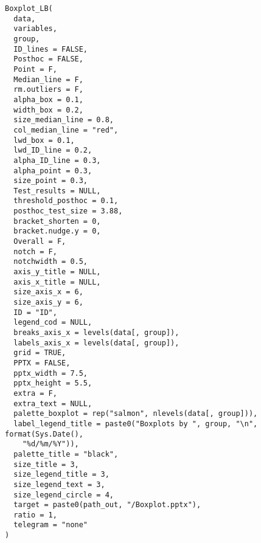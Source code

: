 \documentclass[a4paper]{book}
\begin{document}
\begin{Usage}
\begin{verbatim}
Boxplot_LB(
  data,
  variables,
  group,
  ID_lines = FALSE,
  Posthoc = FALSE,
  Point = F,
  Median_line = F,
  rm.outliers = F,
  alpha_box = 0.1,
  width_box = 0.2,
  size_median_line = 0.8,
  col_median_line = "red",
  lwd_box = 0.1,
  lwd_ID_line = 0.2,
  alpha_ID_line = 0.3,
  alpha_point = 0.3,
  size_point = 0.3,
  Test_results = NULL,
  threshold_posthoc = 0.1,
  posthoc_test_size = 3.88,
  bracket_shorten = 0,
  bracket.nudge.y = 0,
  Overall = F,
  notch = F,
  notchwidth = 0.5,
  axis_y_title = NULL,
  axis_x_title = NULL,
  size_axis_x = 6,
  size_axis_y = 6,
  ID = "ID",
  legend_cod = NULL,
  breaks_axis_x = levels(data[, group]),
  labels_axis_x = levels(data[, group]),
  grid = TRUE,
  PPTX = FALSE,
  pptx_width = 7.5,
  pptx_height = 5.5,
  extra = F,
  extra_text = NULL,
  palette_boxplot = rep("salmon", nlevels(data[, group])),
  label_legend_title = paste0("Boxplots by ", group, "\n", format(Sys.Date(),
    "%d/%m/%Y")),
  palette_title = "black",
  size_title = 3,
  size_legend_title = 3,
  size_legend_text = 3,
  size_legend_circle = 4,
  target = paste0(path_out, "/Boxplot.pptx"),
  ratio = 1,
  telegram = "none"
)
\end{verbatim}
\end{Usage}
%
\end{document}
